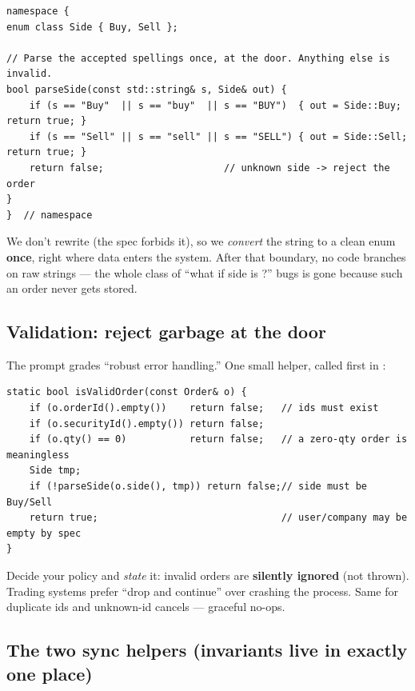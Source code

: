 \begin{lstlisting}
namespace {
enum class Side { Buy, Sell };

// Parse the accepted spellings once, at the door. Anything else is invalid.
bool parseSide(const std::string& s, Side& out) {
    if (s == "Buy"  || s == "buy"  || s == "BUY")  { out = Side::Buy;  return true; }
    if (s == "Sell" || s == "sell" || s == "SELL") { out = Side::Sell; return true; }
    return false;                     // unknown side -> reject the order
}
}  // namespace
\end{lstlisting}

\begin{intu}
We don't rewrite  (the spec forbids it), so we \emph{convert} the
string to a clean enum \textbf{once}, right where data enters the system. After
that boundary, no code branches on raw strings --- the whole class of ``what if
side is ?'' bugs is gone because such an order never gets stored.
\end{intu}

\subsection{Validation: reject garbage at the door}

The prompt grades ``robust error handling.'' One small helper, called first in
:

\begin{lstlisting}
static bool isValidOrder(const Order& o) {
    if (o.orderId().empty())    return false;   // ids must exist
    if (o.securityId().empty()) return false;
    if (o.qty() == 0)           return false;   // a zero-qty order is meaningless
    Side tmp;
    if (!parseSide(o.side(), tmp)) return false;// side must be Buy/Sell
    return true;                                // user/company may be empty by spec
}
\end{lstlisting}

\begin{pitfall}
Decide your policy and \emph{state} it: invalid orders are \textbf{silently
ignored} (not thrown). Trading systems prefer ``drop and continue'' over crashing
the process. Same for duplicate ids and unknown-id cancels --- graceful no-ops.
\end{pitfall}

\subsection{The two sync helpers (invariants live in exactly one place)}

